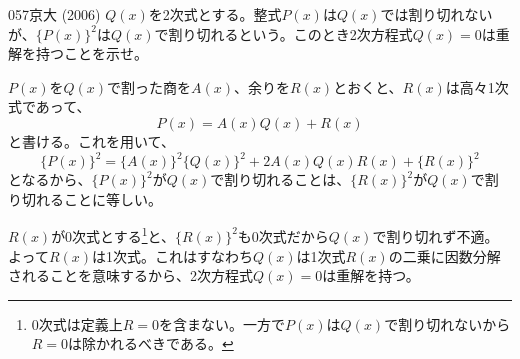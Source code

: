 \begin{prob}{057}{}{京大 (2006)}
 $Q(x)$を2次式とする。整式$P(x)$は$Q(x)$では割り切れないが、$\{P(x)\}^2$は$Q(x)$で割り切れるという。このとき2次方程式$Q(x)=0$は重解を持つことを示せ。
\end{prob}

$P(x)$を$Q(x)$で割った商を$A(x)$、余りを$R(x)$とおくと、$R(x)$は高々1次式であって、
\[ P(x)=A(x)Q(x)+R(x) \]
と書ける。これを用いて、
\[ \{P(x)\}^2=\{A(x)\}^2\{Q(x)\}^2+2A(x)Q(x)R(x)+\{R(x)\}^2 \]
となるから、$\{P(x)\}^2$が$Q(x)$で割り切れることは、$\{R(x)\}^2$が$Q(x)$で割り切れることに等しい。

$R(x)$が0次式とする\footnote{0次式は定義上$R=0$を含まない。一方で$P(x)$は$Q(x)$で割り切れないから$R=0$は除かれるべきである。}と、$\{R(x)\}^2$も0次式だから$Q(x)$で割り切れず不適。よって$R(x)$は1次式。これはすなわち$Q(x)$は1次式$R(x)$の二乗に因数分解されることを意味するから、2次方程式$Q(x)=0$は重解を持つ。